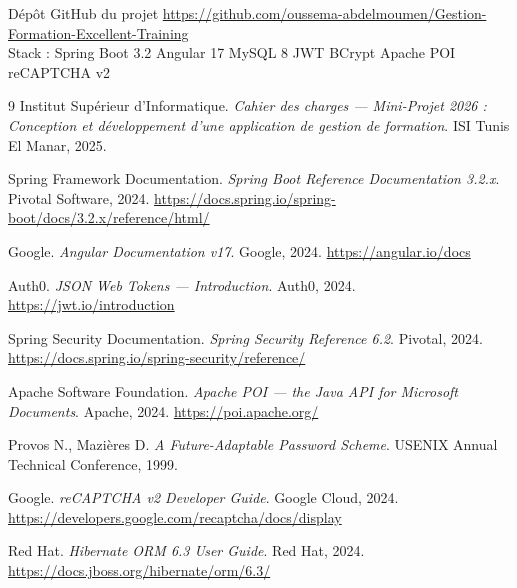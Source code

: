 \documentclass[12pt,a4paper]{report}
\begin{document}
\vspace{1cm}
\begin{successbox}{D\'{e}p\^{o}t GitHub du projet}
  \small\url{https://github.com/oussema-abdelmoumen/Gestion-Formation-Excellent-Training}\\[4pt]
  \footnotesize Stack : Spring Boot 3.2 \textbullet{} Angular 17 \textbullet{} MySQL 8 \textbullet{} JWT \textbullet{} BCrypt \textbullet{} Apache POI \textbullet{} reCAPTCHA v2
\end{successbox}

\begin{thebibliography}{9}
   Institut Sup\'{e}rieur d'Informatique.
    \textit{Cahier des charges --- Mini-Projet 2026 : Conception et d\'{e}veloppement d'une application de gestion de formation}.
    ISI Tunis El Manar, 2025.

   Spring Framework Documentation.
    \textit{Spring Boot Reference Documentation 3.2.x}.
    Pivotal Software, 2024. \url{https://docs.spring.io/spring-boot/docs/3.2.x/reference/html/}

   Google.
    \textit{Angular Documentation v17}.
    Google, 2024. \url{https://angular.io/docs}

   Auth0.
    \textit{JSON Web Tokens --- Introduction}.
    Auth0, 2024. \url{https://jwt.io/introduction}

   Spring Security Documentation.
    \textit{Spring Security Reference 6.2}.
    Pivotal, 2024. \url{https://docs.spring.io/spring-security/reference/}

   Apache Software Foundation.
    \textit{Apache POI --- the Java API for Microsoft Documents}.
    Apache, 2024. \url{https://poi.apache.org/}

   Provos N., Mazi\`{e}res D.
    \textit{A Future-Adaptable Password Scheme}.
    USENIX Annual Technical Conference, 1999.

   Google.
    \textit{reCAPTCHA v2 Developer Guide}.
    Google Cloud, 2024. \url{https://developers.google.com/recaptcha/docs/display}

   Red Hat.
    \textit{Hibernate ORM 6.3 User Guide}.
    Red Hat, 2024. \url{https://docs.jboss.org/hibernate/orm/6.3/}
\end{thebibliography}
\end{document}
